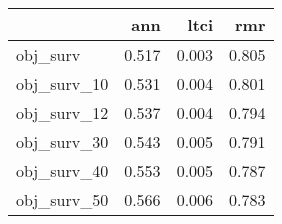 \begin{tabular}{lrrr}
\toprule
{} &    ann &   ltci &    rmr \\
\midrule
obj\_surv    &  0.517 &  0.003 &  0.805 \\
obj\_surv\_10 &  0.531 &  0.004 &  0.801 \\
obj\_surv\_12 &  0.537 &  0.004 &  0.794 \\
obj\_surv\_30 &  0.543 &  0.005 &  0.791 \\
obj\_surv\_40 &  0.553 &  0.005 &  0.787 \\
obj\_surv\_50 &  0.566 &  0.006 &  0.783 \\
\bottomrule
\end{tabular}
